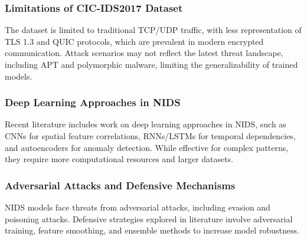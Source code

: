 \subsubsection{Limitations of CIC-IDS2017 Dataset} 
The dataset is limited to traditional TCP/UDP traffic, with less representation of TLS 1.3 and QUIC protocols, which are prevalent in modern encrypted communication. Attack scenarios may not reflect the latest threat landscape, including APT and polymorphic malware, limiting the generalizability of trained models.

\subsubsection{Deep Learning Approaches in NIDS} 
Recent literature includes work on deep learning approaches in NIDS, such as CNNs for spatial feature correlations, RNNs/LSTMs for temporal dependencies, and autoencoders for anomaly detection. While effective for complex patterns, they require more computational resources and larger datasets.

\subsubsection{Adversarial Attacks and Defensive Mechanisms} 
NIDS models face threats from adversarial attacks, including evasion and poisoning attacks. Defensive strategies explored in literature involve adversarial training, feature smoothing, and ensemble methods to increase model robustness.

